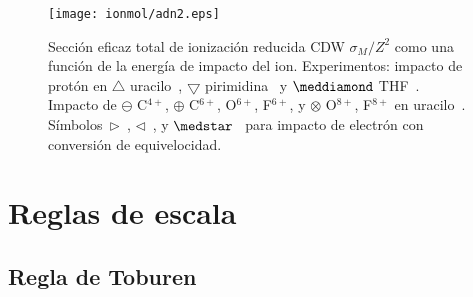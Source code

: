 \begin{figure*}[t!]
\centering
\texttt{[image: ionmol/adn2.eps]}
\caption[Sección eficaz total de ionización reducida de moléculas (parte 2).]
{Sección eficaz total de ionización reducida CDW $\sigma_{M}/Z^2$ como una 
función de la energía de impacto del ion. Experimentos: impacto de protón
en $\triangle$ uracilo~\cite{itoh2013}, 
$\bigtriangledown$ pirimidina~\cite{wolff2014} y $\meddiamond$
THF~\cite{wang2016}. Impacto de $\ominus$ C$^{4+}$, $\oplus$ C$^{6+}$, 
O$^{6+}$, F$^{6+}$, y $\otimes$ O$^{8+}$, F$^{8+}$ en
uracilo~\cite{agnihotri2012,agnihotri2013}. 
Símbolos~$\rhd$~\cite{bug2017}, $\lhd$~\cite{wolf2019}, y 
$\medstar$~\cite{fuss2009} para impacto de electrón con conversión de 
equivelocidad.}
\label{fig:crossDNA_2}
\end{figure*} 

\section{Reglas de escala}
\label{sec:scaling}
\subsection{Regla de Toburen}
\label{subsec:toburen}

